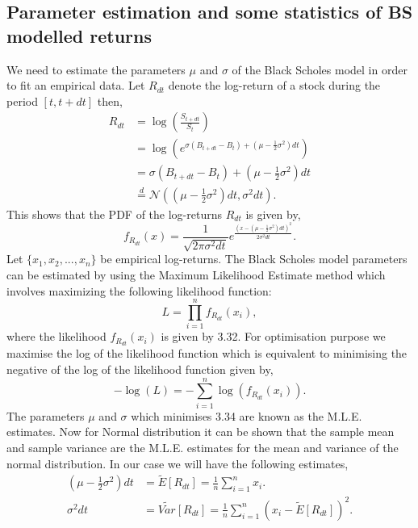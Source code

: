 \documentclass[12pt]{report}
\begin{document}
\subsection{Parameter estimation and some statistics of BS modelled returns}
\label{bs_mle}
We need to estimate the parameters $\mu$ and $\sigma$ of the Black Scholes model in order to fit an empirical data. Let $R_{dt}$ denote the log-return of a stock during the period $[t,t+dt]$ then,
\begin{align*}
    R_{dt} & = \log\left(\frac{S_{t+dt}}{S_t}\right)\\
           & = \log\left(e^{\sigma(B_{t+dt} - B_t) + (\mu - \frac{1}{2} \sigma^{2}) dt}\right)\\
           & = \sigma(B_{t+dt} - B_t) + (\mu - \frac{1}{2} \sigma^{2}) dt\\
           & \stackrel{d}{=} \mathcal{N}\left((\mu - \frac{1}{2} \sigma^{2}) dt, \sigma^{2} dt\right). 
\end{align*}
This shows that the PDF of the log-returns $R_{dt}$ is given by,
\begin{equation}
    f_{R_{dt}}(x) = \frac{1}{\sqrt{2 \pi \sigma^{2} dt }} e^{\frac{(x - (\mu - \frac{1}{2} \sigma^{2}) dt) ^{2}}{2 \sigma^{2} dt}}.
\end{equation}
Let $\{x_1,x_2,...,x_n\}$ be empirical log-returns. The Black Scholes model parameters can be estimated by using the Maximum Likelihood Estimate method which involves maximizing the following likelihood function:\\
\begin{equation}
    L = \prod\limits_{i=1}^n f_{R_{dt}}(x_i),
\end{equation}
where the likelihood $f_{R_{dt}}(x_i)$ is given by 3.32. For optimisation purpose we maximise the log of the likelihood function which is equivalent to minimising the negative of the log of the likelihood function given by,
\begin{equation}
    - \log(L) = - \sum_{i=1}^n \log(f_{R_{dt}}(x_i)).
\end{equation}
The parameters $\mu$ and $\sigma$ which minimises 3.34 are known as the M.L.E. estimates. Now for Normal distribution it can be shown that the sample mean and sample variance are the M.L.E. estimates for the mean and variance of the normal distribution. In our case we will have the following estimates,
\begin{align*}
 (\mu - \frac{1}{2} \sigma^{2}) dt & = \tilde{E}[R_{dt}] = \frac{1}{n} \sum_{i=1}^n x_i. \\
 \sigma^{2} dt & = \tilde{Var}[R_{dt}] = \frac{1}{n} \sum_{i=1}^n (x_i - \tilde{E}[R_{dt}] )^{2}. 
\end{align*}
\end{document}
